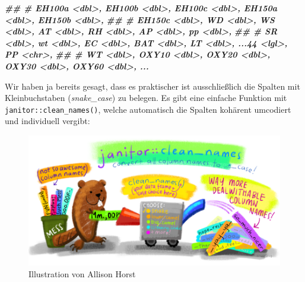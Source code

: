 \documentclass[
]{article}
\newenvironment{Shaded}{\begin{snugshade}}{\end{snugshade}}
\newcommand{\DocumentationTok}[1]{\textcolor[rgb]{0.56,0.35,0.01}{\textbf{\textit{#1}}}}
\begin{document}
\begin{Shaded}
\begin{Highlighting}[]
\DocumentationTok{\#\# \#   EH100a \textless{}dbl\textgreater{}, EH100b \textless{}dbl\textgreater{}, EH100c \textless{}dbl\textgreater{}, EH150a \textless{}dbl\textgreater{}, EH150b \textless{}dbl\textgreater{},}
\DocumentationTok{\#\# \#   EH150c \textless{}dbl\textgreater{}, WD \textless{}dbl\textgreater{}, WS \textless{}dbl\textgreater{}, AT \textless{}dbl\textgreater{}, RH \textless{}dbl\textgreater{}, AP \textless{}dbl\textgreater{}, pp \textless{}dbl\textgreater{},}
\DocumentationTok{\#\# \#   SR \textless{}dbl\textgreater{}, wt \textless{}dbl\textgreater{}, EC \textless{}dbl\textgreater{}, BAT \textless{}dbl\textgreater{}, LT \textless{}dbl\textgreater{}, ...44 \textless{}lgl\textgreater{}, PP \textless{}chr\textgreater{},}
\DocumentationTok{\#\# \#   WT \textless{}dbl\textgreater{}, OXY10 \textless{}dbl\textgreater{}, OXY20 \textless{}dbl\textgreater{}, OXY30 \textless{}dbl\textgreater{}, OXY60 \textless{}dbl\textgreater{}, ...}
\end{Highlighting}
\end{Shaded}

Wir haben ja bereits gesagt, dass es praktischer ist ausschließlich die Spalten mit Kleinbuchstaben (\emph{snake\_case}) zu belegen. Es gibt eine einfache Funktion mit \texttt{janitor::clean\_names()}, welche automatisch die Spalten kohärent umcodiert und individuell vergibt:

\begin{figure}

{\centering \includegraphics[width=1\linewidth]{images/034} 

}

\caption{Illustration von Allison Horst}\label{fig:unnamed-chunk-114}
\end{figure}
\end{document}
